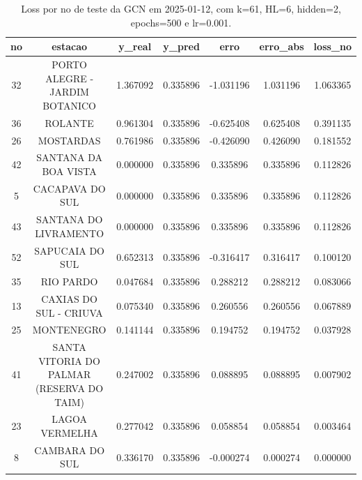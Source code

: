 \begin{table}[h]
\centering
\caption{Loss por no de teste da GCN em 2025-01-12, com k=61, HL=6, hidden=2, epochs=500 e lr=0.001.}
\label{tab:gcn_loss_k61_hl6_h2_e500_d20250112}
\begin{tabular}{ccccccc}
\toprule
no & estacao & y\_real & y\_pred & erro & erro\_abs & loss\_no \\
\midrule
32 & PORTO ALEGRE - JARDIM BOTANICO & 1.367092 & 0.335896 & -1.031196 & 1.031196 & 1.063365 \\
36 & ROLANTE & 0.961304 & 0.335896 & -0.625408 & 0.625408 & 0.391135 \\
26 & MOSTARDAS & 0.761986 & 0.335896 & -0.426090 & 0.426090 & 0.181552 \\
42 & SANTANA DA BOA VISTA & 0.000000 & 0.335896 & 0.335896 & 0.335896 & 0.112826 \\
5 & CACAPAVA DO SUL & 0.000000 & 0.335896 & 0.335896 & 0.335896 & 0.112826 \\
43 & SANTANA DO LIVRAMENTO & 0.000000 & 0.335896 & 0.335896 & 0.335896 & 0.112826 \\
52 & SAPUCAIA DO SUL & 0.652313 & 0.335896 & -0.316417 & 0.316417 & 0.100120 \\
35 & RIO PARDO & 0.047684 & 0.335896 & 0.288212 & 0.288212 & 0.083066 \\
13 & CAXIAS DO SUL - CRIUVA & 0.075340 & 0.335896 & 0.260556 & 0.260556 & 0.067889 \\
25 & MONTENEGRO & 0.141144 & 0.335896 & 0.194752 & 0.194752 & 0.037928 \\
41 & SANTA VITORIA DO PALMAR (RESERVA DO TAIM) & 0.247002 & 0.335896 & 0.088895 & 0.088895 & 0.007902 \\
23 & LAGOA VERMELHA & 0.277042 & 0.335896 & 0.058854 & 0.058854 & 0.003464 \\
8 & CAMBARA DO SUL & 0.336170 & 0.335896 & -0.000274 & 0.000274 & 0.000000 \\
\bottomrule
\end{tabular}
\end{table}
